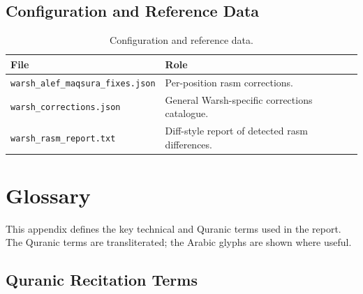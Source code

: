 \documentclass[12pt,a4paper]{report}
\begin{document}
\section{Configuration and Reference Data}

\begin{table}[H]
  \centering
  \caption{Configuration and reference data.}
  \label{tab:mt_app_config}
  \renewcommand{\arraystretch}{1.3}
  \begin{tabular}{lp{8cm}}
    \toprule
    \textbf{File} & \textbf{Role} \\
    \midrule
    \texttt{warsh\_alef\_maqsura\_fixes.json} & Per-position rasm corrections. \\
    \texttt{warsh\_corrections.json}          & General Warsh-specific corrections catalogue. \\
    \texttt{warsh\_rasm\_report.txt}          & Diff-style report of detected rasm differences. \\
    \bottomrule
  \end{tabular}
\end{table}

\chapter{Glossary}
\label{app:mt_glossary}

This appendix defines the key technical and Quranic terms used in the
report. The Quranic terms are transliterated; the Arabic glyphs are
shown where useful.

\section{Quranic Recitation Terms}
\end{document}
